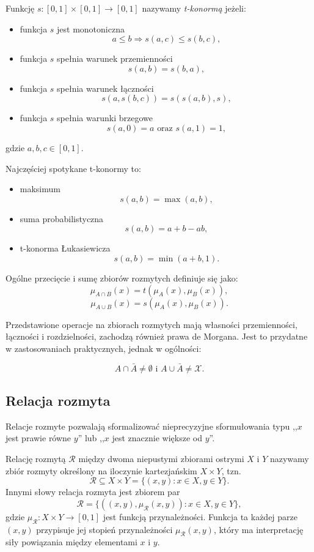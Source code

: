 \begin{definition}[t-konorma]
Funkcję $s : [0,1] \times [0,1] \rightarrow [0,1]$ nazywamy \emph{t-konormą}
jeżeli:
\begin{itemize}
  \item funkcja $s$ jest monotoniczna $$a \leq b \Rightarrow s(a,c) \leq
  s(b,c),$$
  \item funkcja $s$ spełnia warunek przemienności $$s(a,b) = s(b,a),$$
  \item funkcja $s$ spełnia warunek łączności $$s(a, s(b,c)) = s(s(a,b),s),$$
  \item funkcja $s$ spełnia warunki brzegowe $$s(a,0)=a \textrm{ oraz }
  s(a,1)=1,$$
\end{itemize}
gdzie $a, b, c \in [0,1]$.
\end{definition}

Najczęściej spotykane t-konormy to:
\begin{itemize}
  \item maksimum $$s(a,b) = \max(a,b),$$
  \item suma probabilistyczna $$s(a,b) = a+b-ab,$$
  \item t-konorma Łukasiewicza $$s(a,b) = \min(a+b,1).$$
\end{itemize}

Ogólne przecięcie i sumę zbiorów rozmytych definiuje się jako:
$$\mu_{A \cap B}(x) = t(\mu_A(x), \mu_B(x)), $$
$$\mu_{A \cup B}(x) = s(\mu_A(x), \mu_B(x)). $$

Przedstawione operacje na zbiorach rozmytych mają własności przemienności,
łączności i rozdzielności, zachodzą również prawa de Morgana. Jest to przydatne
w zastosowaniach praktycznych, jednak w ogólności:

$$A \cap \bar{A} \neq \emptyset \textrm{ i } A \cup \bar{A} \neq \mathcal{X}.$$

\subsection{Relacja rozmyta}
Relacje rozmyte pozwalają sformalizować nieprecyzyjne sformułowania typu ,,$x$
jest prawie równe $y$'' lub ,,$x$ jest znacznie większe od $y$''.

\begin{definition}
Relację rozmytą $\mathcal{R}$ między dwoma niepustymi zbiorami ostrymi $X$ i $Y$
nazywamy zbiór rozmyty określony na iloczynie kartezjańskim $X \times Y$, tzn.
$$\mathcal{R} \subseteq X \times Y = \{ (x,y) : x \in X, y \in Y \}.$$
Innymi słowy relacja rozmyta jest zbiorem par
\begin{equation}
\mathcal{R} = \{ ((x,y), \mu_{\mathcal{R}}(x,y)) : x \in X, y \in Y \},
\end{equation}
gdzie $\mu_{\mathcal{R}} : X \times Y \rightarrow [0,1]$ jest funkcją
przynależności. Funkcja ta każdej parze $(x,y)$ przypisuje jej stopień
przynależności $\mu_{\mathcal{R}}(x,y)$, który ma interpretację siły powiązania
między elementami $x$ i $y$.
\end{definition}

